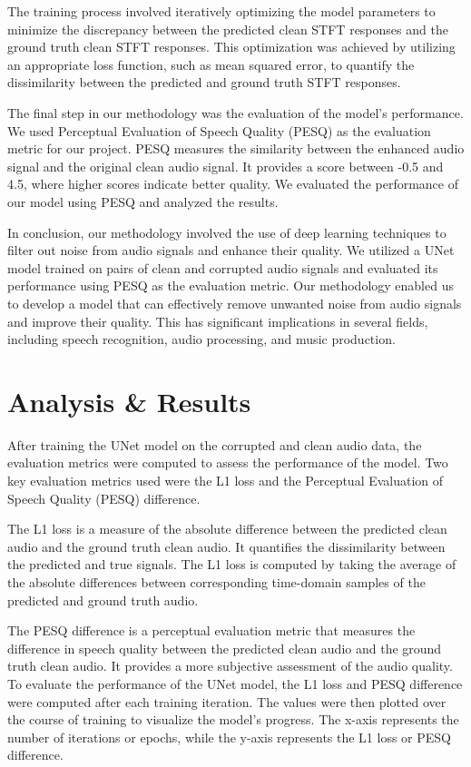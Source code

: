 \documentclass[conference]{IEEEtran}
\begin{document}
The training process involved iteratively optimizing the model parameters to minimize the discrepancy between the predicted clean STFT responses and the ground truth clean STFT responses. This optimization was achieved by utilizing an appropriate loss function, such as mean squared error, to quantify the dissimilarity between the predicted and ground truth STFT responses. 

The final step in our methodology was the evaluation of the model's performance. We used Perceptual Evaluation of Speech Quality (PESQ) as the evaluation metric for our project. PESQ measures the similarity between the enhanced audio signal and the original clean audio signal. It provides a score between -0.5 and 4.5, where higher scores indicate better quality. We evaluated the performance of our model using PESQ and analyzed the results.

In conclusion, our methodology involved the use of deep learning techniques to filter out noise from audio signals and enhance their quality. We utilized a UNet model trained on pairs of clean and corrupted audio signals and evaluated its performance using PESQ as the evaluation metric. Our methodology enabled us to develop a model that can effectively remove unwanted noise from audio signals and improve their quality. This has significant implications in several fields, including speech recognition, audio processing, and music production.

\section{Analysis \& Results}
After training the UNet model on the corrupted and clean audio data, the evaluation metrics were computed to assess the performance of the model. Two key evaluation metrics used were the L1 loss and the Perceptual Evaluation of Speech Quality (PESQ) difference.

The L1 loss is a measure of the absolute difference between the predicted clean audio and the ground truth clean audio. It quantifies the dissimilarity between the predicted and true signals. The L1 loss is computed by taking the average of the absolute differences between corresponding time-domain samples of the predicted and ground truth audio.

The PESQ difference is a perceptual evaluation metric that measures the difference in speech quality between the predicted clean audio and the ground truth clean audio. It provides a more subjective assessment of the audio quality. To evaluate the performance of the UNet model, the L1 loss and PESQ difference were computed after each training iteration. The values were then plotted over the course of training to visualize the model's progress. The x-axis represents the number of iterations or epochs, while the y-axis represents the L1 loss or PESQ difference.
\end{document}
